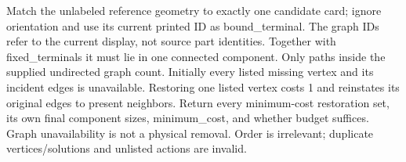 Match the unlabeled reference geometry to exactly one candidate card; ignore orientation and use its current printed ID as bound\_terminal. The graph IDs refer to the current display, not source part identities. Together with fixed\_terminals it must lie in one connected component. Only paths inside the supplied undirected graph count. Initially every listed missing vertex and its incident edges is unavailable. Restoring one listed vertex costs 1 and reinstates its original edges to present neighbors. Return every minimum-cost restoration set, its own final component sizes, minimum\_cost, and whether budget suffices. Graph unavailability is not a physical removal. Order is irrelevant; duplicate vertices/solutions and unlisted actions are invalid.
